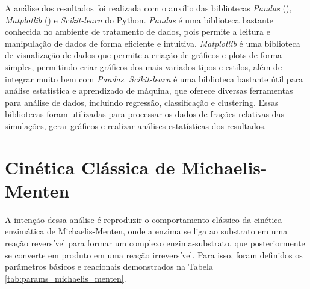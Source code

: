 \documentclass[12pt,oneside]{report}
\begin{document}
A análise dos resultados foi realizada com o auxílio das bibliotecas \textit{Pandas} (), \textit{Matplotlib} () e \textit{Scikit-learn} do Python. \textit{Pandas} é uma biblioteca bastante conhecida no ambiente de tratamento de dados, pois permite a leitura e manipulação de dados de forma eficiente e intuitiva. \textit{Matplotlib} é uma biblioteca de visualização de dados que permite a criação de gráficos e plots de forma simples, permitindo criar gráficos dos mais variados tipos e estilos, além de integrar muito bem com \textit{Pandas}. \textit{Scikit-learn} é uma biblioteca bastante útil para análise estatística e aprendizado de máquina, que oferece diversas ferramentas para análise de dados, incluindo regressão, classificação e clustering. Essas bibliotecas foram utilizadas para processar os dados de frações relativas das simulações, gerar gráficos e realizar análises estatísticas dos resultados.

\section{Cinética Clássica de Michaelis-Menten}

A intenção dessa análise é reproduzir o comportamento clássico da cinética enzimática de Michaelis-Menten, onde a enzima se liga ao substrato em uma reação reversível para formar um complexo enzima-substrato, que posteriormente se converte em produto em uma reação irreversível. Para isso, foram definidos os parâmetros básicos e reacionais demonstrados na Tabela \ref{tab:params_michaelis_menten}.
\end{document}
